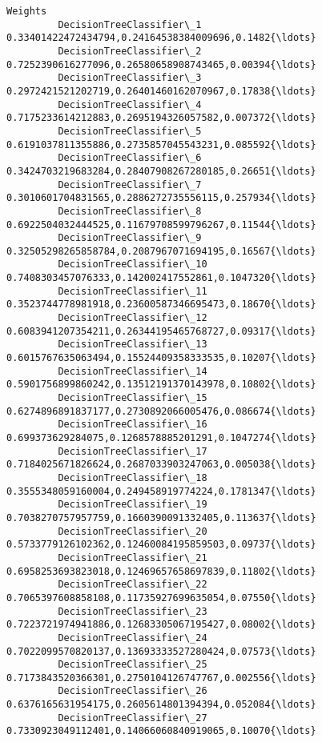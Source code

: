 \documentclass[11pt]{article}
\begin{document}
\begin{Verbatim}[commandchars=\\\{\}]
                                                                               Weights  
         DecisionTreeClassifier\_1    0.33401422472434794,0.24164538384009696,0.1482{\ldots}  
         DecisionTreeClassifier\_2    0.7252390616277096,0.26580658908743465,0.00394{\ldots}  
         DecisionTreeClassifier\_3    0.2972421521202719,0.26401460162070967,0.17838{\ldots}  
         DecisionTreeClassifier\_4    0.7175233614212883,0.2695194326057582,0.007372{\ldots}  
         DecisionTreeClassifier\_5    0.6191037811355886,0.2735857045543231,0.085592{\ldots}  
         DecisionTreeClassifier\_6    0.3424703219683284,0.28407908267280185,0.26651{\ldots}  
         DecisionTreeClassifier\_7    0.3010601704831565,0.2886272735556115,0.257934{\ldots}  
         DecisionTreeClassifier\_8    0.6922504032444525,0.11679708599796267,0.11544{\ldots}  
         DecisionTreeClassifier\_9    0.32505298265858784,0.2087967071694195,0.16567{\ldots}  
         DecisionTreeClassifier\_10   0.7408303457076333,0.142002417552861,0.1047320{\ldots}  
         DecisionTreeClassifier\_11   0.3523744778981918,0.23600587346695473,0.18670{\ldots}  
         DecisionTreeClassifier\_12   0.6083941207354211,0.26344195465768727,0.09317{\ldots}  
         DecisionTreeClassifier\_13   0.6015767635063494,0.15524409358333535,0.10207{\ldots}  
         DecisionTreeClassifier\_14   0.5901756899860242,0.13512191370143978,0.10802{\ldots}  
         DecisionTreeClassifier\_15   0.6274896891837177,0.2730892066005476,0.086674{\ldots}  
         DecisionTreeClassifier\_16   0.699373629284075,0.1268578885201291,0.1047274{\ldots}  
         DecisionTreeClassifier\_17   0.7184025671826624,0.2687033903247063,0.005038{\ldots}  
         DecisionTreeClassifier\_18   0.3555348059160004,0.249458919774224,0.1781347{\ldots}  
         DecisionTreeClassifier\_19   0.7038270757957759,0.1660390091332405,0.113637{\ldots}  
         DecisionTreeClassifier\_20   0.5733779126102362,0.12460084195859503,0.09737{\ldots}  
         DecisionTreeClassifier\_21   0.6958253693823018,0.12469657658697839,0.11802{\ldots}  
         DecisionTreeClassifier\_22   0.7065397608858108,0.11735927699635054,0.07550{\ldots}  
         DecisionTreeClassifier\_23   0.7223721974941886,0.12683305067195427,0.08002{\ldots}  
         DecisionTreeClassifier\_24   0.7022099570820137,0.13693333527280424,0.07573{\ldots}  
         DecisionTreeClassifier\_25   0.7173843520366301,0.2750104126747767,0.002556{\ldots}  
         DecisionTreeClassifier\_26   0.6376165631954175,0.2605614801394394,0.052084{\ldots}  
         DecisionTreeClassifier\_27   0.7330923049112401,0.14066060840919065,0.10070{\ldots}  

\end{Verbatim}
\end{document}
